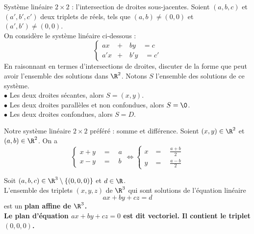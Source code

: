 \documentclass[11pt]{article}
\begin{document}
\begin{ex}{Système linéaire $2\times2$ : l'intersection de droites sous-jacentes.}{}
    Soient $(a,b,c)$ et $(a',b',c')$ deux triplets de réels, tels que $(a,b)\neq(0,0)$ et $(a',b')\neq(0,0)$.\\
    On considère le système linéaire ci-dessous :
    \begin{equation*}
        \begin{cases}
            ax&+\quad by\quad= c\\
            a'x&+\quad b'y\quad=c'
        \end{cases}
    \end{equation*}
    En raisonnant en termes d'intersections de droites, discuter de la forme que peut avoir l'ensemble des solutions dans $\R^2$.
    \tcblower
    Notons $S$ l'ensemble des solutions de ce système.\\
    $\bullet$ Les deux droites sécantes, alors $S=(x,y)$.\\
    $\bullet$ Les deux droites parallèles et non confondues, alors $S=\0$.\\
    $\bullet$ Les deux droites confondues, alors $S=D$.
\end{ex}

\begin{ex}{Notre système linéaire $2\times2$ préféré : somme et différence.}{}
    Soient $(x,y)\in\R^2$ et $(a,b)\in\R^2$. On a
    \begin{equation*}
        \begin{cases}
            x+y\quad=\quad a\\
            x-y\quad=\quad b
        \end{cases}
        \iff
        \begin{cases}
            x&=\quad\frac{a+b}{2}\\
            y&=\quad\frac{a-b}{2}
        \end{cases}
    \end{equation*}
\end{ex}


\begin{defi}{}{}
    Soit $(a,b,c)\in\R^3\setminus\{(0,0,0)\}$ et $d\in\R$.\\
    L'ensemble des triplets $(x,y,z)$ de $\R^3$ qui sont solutions de l'équation linéaire
    \begin{equation*}
        ax+by+cz=d
    \end{equation*}
    est un \bf{plan affine} de $\R^3$.\\
    Le plan d'équation $ax+by+cz=0$ est dit \bf{vectoriel}. Il contient le triplet $(0,0,0)$.
\end{defi}
\end{document}

